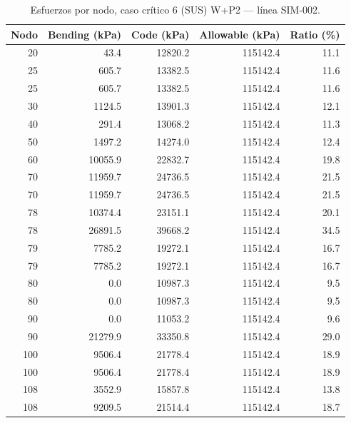 \begin{table}[htbp]
  \centering
  \footnotesize
  \caption{Esfuerzos por nodo, caso crítico 6 (SUS) W+P2 — línea SIM-002.}
  \label{tab:esfuerzos-critico}
  \begin{tabular}{rrrrr}
    \toprule
    Nodo & Bending (\si{kPa}) & Code (\si{kPa}) & Allowable (\si{kPa}) & Ratio (\%) \\
    \midrule
    20 & \num{43.4} & \num{12820.2} & \num{115142.4} & 11.1 \\
    25 & \num{605.7} & \num{13382.5} & \num{115142.4} & 11.6 \\
    25 & \num{605.7} & \num{13382.5} & \num{115142.4} & 11.6 \\
    30 & \num{1124.5} & \num{13901.3} & \num{115142.4} & 12.1 \\
    40 & \num{291.4} & \num{13068.2} & \num{115142.4} & 11.3 \\
    50 & \num{1497.2} & \num{14274.0} & \num{115142.4} & 12.4 \\
    60 & \num{10055.9} & \num{22832.7} & \num{115142.4} & 19.8 \\
    70 & \num{11959.7} & \num{24736.5} & \num{115142.4} & 21.5 \\
    70 & \num{11959.7} & \num{24736.5} & \num{115142.4} & 21.5 \\
    78 & \num{10374.4} & \num{23151.1} & \num{115142.4} & 20.1 \\
    78 & \num{26891.5} & \num{39668.2} & \num{115142.4} & 34.5 \\
    79 & \num{7785.2} & \num{19272.1} & \num{115142.4} & 16.7 \\
    79 & \num{7785.2} & \num{19272.1} & \num{115142.4} & 16.7 \\
    80 & \num{0.0} & \num{10987.3} & \num{115142.4} & 9.5 \\
    80 & \num{0.0} & \num{10987.3} & \num{115142.4} & 9.5 \\
    90 & \num{0.0} & \num{11053.2} & \num{115142.4} & 9.6 \\
    90 & \num{21279.9} & \num{33350.8} & \num{115142.4} & 29.0 \\
    100 & \num{9506.4} & \num{21778.4} & \num{115142.4} & 18.9 \\
    100 & \num{9506.4} & \num{21778.4} & \num{115142.4} & 18.9 \\
    108 & \num{3552.9} & \num{15857.8} & \num{115142.4} & 13.8 \\
    108 & \num{9209.5} & \num{21514.4} & \num{115142.4} & 18.7 \\

\end{tabular}
\end{table}
